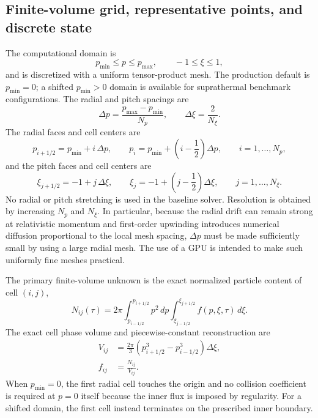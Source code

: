 \documentclass[11pt]{article}
\begin{document}
\subsection{Finite-volume grid, representative points, and discrete state}

The computational domain is
\begin{equation}
 p_{\min}\le p\le p_{\max},\qquad -1\le\xi\le1,
\end{equation}
and is discretized with a uniform tensor-product mesh.  The production default is
$p_{\min}=0$; a shifted $p_{\min}>0$ domain is available for suprathermal benchmark
configurations.  The radial and pitch spacings are
\begin{equation}
 \Delta p=\frac{p_{\max}-p_{\min}}{N_p},\qquad
 \Delta\xi=\frac{2}{N_\xi}.
 \label{eq:uniform_mesh_spacing}
\end{equation}
The radial faces and cell centers are
\begin{equation}
 p_{i+1/2}=p_{\min}+i\,\Delta p,\qquad
 p_i=p_{\min}+\left(i-\frac12\right)\Delta p,
 \qquad i=1,\ldots,N_p,
 \label{eq:uniform_p_grid}
\end{equation}
and the pitch faces and cell centers are
\begin{equation}
 \xi_{j+1/2}=-1+j\,\Delta\xi,\qquad
 \xi_j=-1+\left(j-\frac12\right)\Delta\xi,
 \qquad j=1,\ldots,N_\xi.
 \label{eq:uniform_xi_grid}
\end{equation}
No radial or pitch stretching is used in the baseline solver.  Resolution is obtained
by increasing $N_p$ and $N_\xi$.  In particular, because the radial drift can remain
strong at relativistic momentum and first-order upwinding introduces numerical diffusion
proportional to the local mesh spacing, $\Delta p$ must be made sufficiently small by
using a large radial mesh.  The use of a GPU is intended to make such uniformly fine
meshes practical.

The primary finite-volume unknown is the exact normalized particle content of cell
$(i,j)$,
\begin{equation}
 N_{ij}(\tau)
 =2\pi\int_{p_{i-1/2}}^{p_{i+1/2}}p^2\,dp
       \int_{\xi_{j-1/2}}^{\xi_{j+1/2}}f(p,\xi,\tau)\,d\xi.
 \label{eq:cellcontent}
\end{equation}
The exact cell phase volume and piecewise-constant reconstruction are
\begin{align}
 V_{ij}
 &=\frac{2\pi}{3}
   \left(p_{i+1/2}^3-p_{i-1/2}^3\right)
   \Delta\xi,
 \label{eq:cellvolume}\\
 f_{ij}&=\frac{N_{ij}}{V_{ij}}.
 \label{eq:cell_reconstruction}
\end{align}
When $p_{\min}=0$, the first radial cell touches the origin and no collision coefficient
is required at $p=0$ itself because the inner flux is imposed by regularity.  For a
shifted domain, the first cell instead terminates on the prescribed inner boundary.
\end{document}

